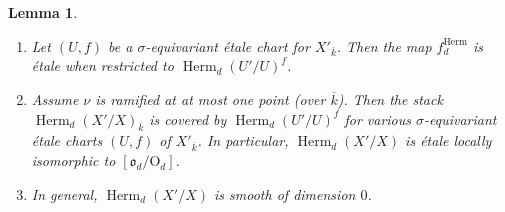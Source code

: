 \documentclass[reqno]{amsart}
\numberwithin{equation}{section}
\DeclareMathOperator{\Herm}{Herm}
\newcommand{\ov}{\overline}
\newcommand\Og{\mathrm{O}}
\newcommand{\s}{\sigma}
\newcommand\fro{\mathfrak{o}}
\newtheorem{lemma}[thm]{Lemma}
\theoremstyle{remark}
\numberwithin{equation}{section}
\begin{document}
\begin{lemma}\label{l:Herm local}
\begin{enumerate}
\item Let $(U,f)$ be a $\s$-equivariant \'etale chart for $X'_{\ov k}$. Then the map $f^{\Herm}_{d}$ is \'etale when restricted to $\Herm_{d}(U'/U)^{f}$. 
\item Assume $\nu$ is ramified at at most one point (over $\ov k$). Then the stack $\Herm_{d}(X'/X)_{\ov k}$  is covered by $\Herm_{d}(U'/U)^{f}$ for various $\s$-equivariant \'etale charts $(U,f)$ of $X'_{\ov k}$. In particular,  $\Herm_{d}(X'/X)$ is \'etale locally isomorphic to  $[\fro_{d}/\Og_{d}]$.
\item In general, $\Herm_{d}(X'/X)$ is smooth of dimension $0$.
\end{enumerate}
\end{lemma}
\end{document}
